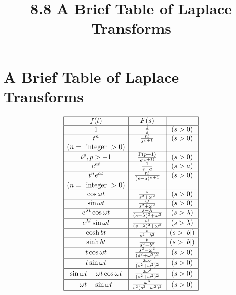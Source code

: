 \documentclass{ximera}
\title{8.8 A Brief Table of Laplace Transforms}%
\begin{document}
 
 
 
\maketitle
 
\section*{A Brief Table of Laplace Transforms}
 
$$
\begin{array}{|c|c|c|}
\hline
    f(t)  &  F(s)  &   \\
\hline
  1  &  \frac{1}{s} & (s > 0)\\
\hline
  t^n  &  \frac{n!}{s^{n+1}}  & (s > 0) \\
  (n = \text{ integer } > 0)  & & \\
\hline
  t^p,  p > -1  & \frac{\Gamma (p+1)}{s^{(p+1)}} & (s>0) \\
\hline
  e^{at}  &  \frac{1}{s-a}  & (s > a) \\
\hline
  t^ne^{at}  &  \frac{n!}{(s-a)^{n+1}}  & (s > 0) \\
  (n= \text{ integer } > 0)  & & \\
\hline 
  \cos \omega t  & \frac{s}{s^2+\omega^2}  & (s > 0) \\
\hline
 \sin \omega t  & \frac{\omega}{s^2+\omega^2}  & (s > 0) \\
\hline
  e^{\lambda t} \cos \omega t  & \frac{s - \lambda}{(s-\lambda)^2+\omega^2}  & (s >
\lambda) \\
\hline
 e^{\lambda t} \sin \omega t  &
\frac{\omega}{(s-\lambda)^2+\omega^2}  & (s >
\lambda) \\
\hline
  \cosh bt  &  \frac{s}{s^2-b^2}  & (s > |b|)\\
  \hline
  \sinh bt  &  \frac{b}{s^2-b^2}  & (s > |b|) \\
  \hline
 t \cos \omega t  &
\frac{s^2-\omega^2}{(s^2+\omega^2)^2}  & (s>0)\\
\hline
  t \sin \omega t  &
\frac{2\omega s}{(s^2+\omega^2)^2}  & (s>0)\\
\hline
  \sin \omega t -\omega t\cos  \omega t
 & \frac{2\omega^3}{(s^2+\omega^2)^2} & (s>0)\\
 \hline
  \omega t - \sin  \omega t   &
\frac{\omega^3}{s^2(s^2+\omega^2)^2} & (s>0) \\
\hline

\end{array}$$
\end{document}
